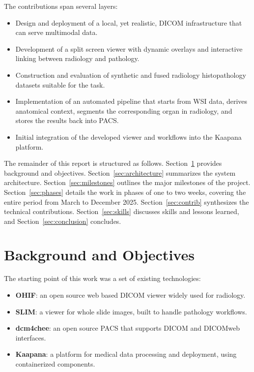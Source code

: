\documentclass[11pt,a4paper]{article}
\begin{document}
The contributions span several layers:
\begin{itemize}
    \item Design and deployment of a local, yet realistic, DICOM infrastructure that can serve multimodal data.
    \item Development of a split screen viewer with dynamic overlays and interactive linking between radiology and pathology.
    \item Construction and evaluation of synthetic and fused radiology histopathology datasets suitable for the task.
    \item Implementation of an automated pipeline that starts from WSI data, derives anatomical context, segments the corresponding organ in radiology, and stores the results back into PACS.
    \item Initial integration of the developed viewer and workflows into the Kaapana platform.
\end{itemize}

The remainder of this report is structured as follows. Section~\ref{sec:background} provides background and objectives. Section~\ref{sec:architecture} summarizes the system architecture. Section~\ref{sec:milestones} outlines the major milestones of the project. Section~\ref{sec:phases} details the work in phases of one to two weeks, covering the entire period from March to December 2025. Section~\ref{sec:contrib} synthesizes the technical contributions. Section~\ref{sec:skills} discusses skills and lessons learned, and Section~\ref{sec:conclusion} concludes.

\section{Background and Objectives}
\label{sec:background}

The starting point of this work was a set of existing technologies:
\begin{itemize}
    \item \textbf{OHIF}: an open source web based DICOM viewer widely used for radiology.
    \item \textbf{SLIM}: a viewer for whole slide images, built to handle pathology workflows.
    \item \textbf{dcm4chee}: an open source PACS that supports DICOM and DICOMweb interfaces.
    \item \textbf{Kaapana}: a platform for medical data processing and deployment, using containerized components.
\end{itemize}
\end{document}
